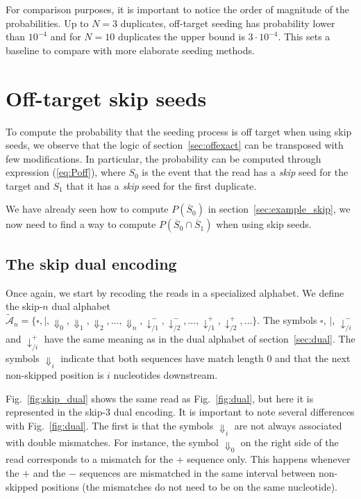\documentclass{article}
\begin{document}
For comparison purposes, it is important to notice the order of magnitude
of the probabilities. Up to $N=3$ duplicates, off-target seeding has
probability lower than $10^{-4}$ and for $N=10$ duplicates the upper bound
is $3\cdot10^{-4}$. This sets a baseline to compare with more elaborate
seeding methods.


\section{Off-target skip seeds}

To compute the probability that the seeding process is off target when
using skip seeds, we observe that the logic of section~\ref{sec:offexact}
can be transposed with few modifications. In particular, the probability
can be computed through expression (\ref{eq:Poff}), where $S_0$ is the
event that the read has a \emph{skip} seed for the target and $S_1$ that
it has a \emph{skip} seed for the first duplicate.

We have already seen how to compute $P(\overline{S}_0)$ in
section~\ref{sec:example_skip}, we now need to find a way to compute
$P(\overline{S}_0 \cap \overline{S}_1)$ when using skip seeds.

\subsection{The skip dual encoding}

Once again, we start by recoding the reads in a specialized alphabet. We
define the skip-$n$ dual alphabet $\tilde{\mathcal{A}}_n = \{\square, |,
\Downarrow_0, \Downarrow_1, \Downarrow_2, \ldots, \Downarrow_n,
\downarrow^-_{/1}, \downarrow^-_{/2}, \ldots, \downarrow^+_{/1},
\downarrow^+_{/2}, \ldots\}$. The symbols $\square$, $|$,
$\downarrow^-_{/i}$ and $\downarrow^+_{/i}$ have the same meaning as in
the dual alphabet of section~\ref{sec:dual}. The symbols $\Downarrow_i$
indicate that both sequences have match length 0 and that the next
non-skipped position is $i$ nucleotides downstream.

Fig.~\ref{fig:skip_dual} shows the same read as Fig.~\ref{fig:dual}, but
here it is represented in the skip-3 dual encoding. It is important to
note several differences with Fig.~\ref{fig:dual}. The first is that the
symbols $\Downarrow_i$ are not always associated with double mismatches.
For instance, the symbol $\Downarrow_0$ on the right side of the read
corresponds to a mismatch for the $+$ sequence only. This happens whenever
the $+$ and the $-$ sequences are mismatched in the same interval between
non-skipped positions (the mismatches do not need to be on the same
nucleotide).
\end{document}
